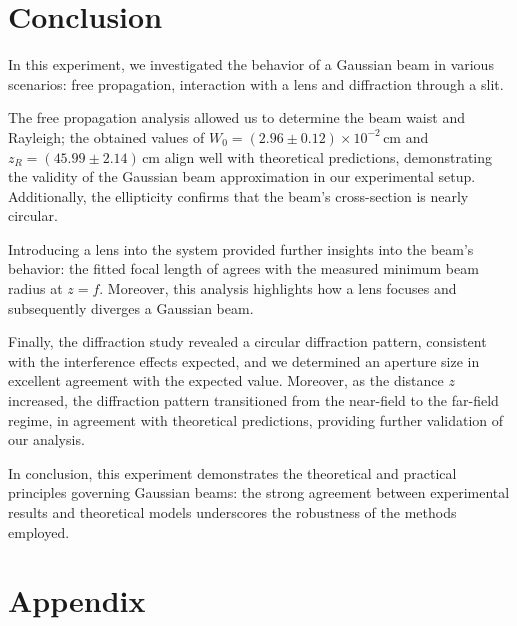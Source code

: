 \documentclass[prl,twocolumn]{revtex4-1}
\begin{document}
\section{Conclusion}

In this experiment, we investigated the behavior of a Gaussian beam in various scenarios: free propagation, interaction with a lens and diffraction through a slit.

The free propagation analysis allowed us to determine the beam waist and Rayleigh; the obtained values of \( W_0 = (2.96 \pm 0.12) \times 10^{-2} \, \text{cm} \) and \( z_R = (45.99 \pm 2.14) \, \text{cm} \) align well with theoretical predictions, demonstrating the validity of the Gaussian beam approximation in our experimental setup. Additionally, the ellipticity confirms that the beam's cross-section is nearly circular.

Introducing a lens into the system provided further insights into the beam's behavior: the fitted focal length of agrees with the measured minimum beam radius at \( z = f \). Moreover, this analysis highlights how a lens focuses and subsequently diverges a Gaussian beam.

Finally, the diffraction study revealed a circular diffraction pattern, consistent with the interference effects expected, and we determined an aperture size in excellent agreement with the expected value. Moreover, as the distance \( z \) increased, the diffraction pattern transitioned from the near-field to the far-field regime, in agreement with theoretical predictions, providing further validation of our analysis.

In conclusion, this experiment demonstrates the theoretical and practical principles governing Gaussian beams: the strong agreement between experimental results and theoretical models underscores the robustness of the methods employed.




\section{Appendix}
\end{document}
